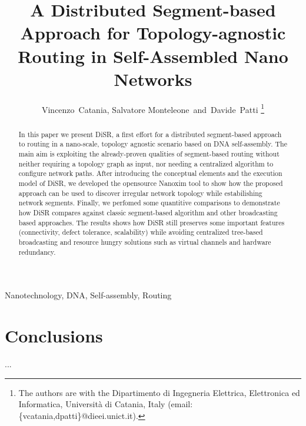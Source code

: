 \documentclass[final,journal,letterpaper]{IEEEtran}
\begin{document}

\title{A Distributed Segment-based Approach for Topology-agnostic
Routing in Self-Assembled Nano Networks} 

\author{Vincenzo~Catania, Salvatore Monteleone~and~Davide~Patti%
\thanks{The authors are with the Dipartimento di Ingegneria
Elettrica, Elettronica ed Informatica, Universit\`a di Catania, Italy
(email: \{vcatania,dpatti\}@dieei.unict.it).}}

\maketitle


\begin{abstract}
In this paper we present DiSR, a first effort for a distributed
segment-based approach to routing in a nano-scale, topology agnostic
scenario based on DNA self-assembly. The main aim is exploiting the
already-proven qualities of segment-based routing without neither requiring a
topology graph as input, nor needing a centralized algorithm to
configure network paths. 
After introducing the conceptual elements and the execution model of
DiSR, we developed the opensource Nanoxim tool to show how the proposed
approach can be used to discover irregular network topology while
estabilishing network segments. Finally, we perfomed some quantitive
comparisons to demonstrate how DiSR compares against classic
segment-based algorithm and other broadcasting based approaches.  The
results shows how DiSR still preserves some important features
(connectivity, defect tolerance, scalability)  while avoiding centralized
tree-based broadcasting and resource hungry solutions such as virtual
channels and hardware redundancy.
\end{abstract}


\begin{IEEEkeywords}
Nanotechnology, DNA, Self-assembly, Routing
\end{IEEEkeywords}








\section{Conclusions}
...


\balance

 


\end{document}

